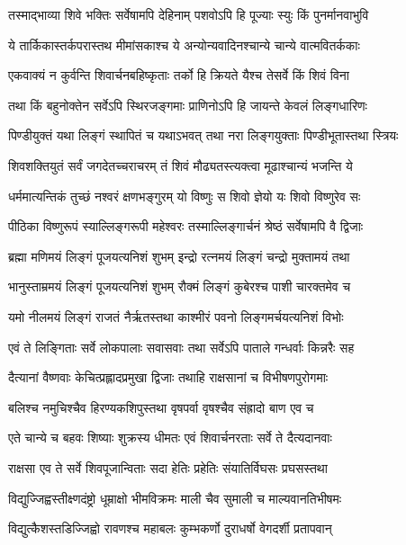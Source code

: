 \twolineshloka
{तस्माद्भाव्या शिवे भक्तिः सर्वेषामपि देहिनाम्}
{पशवोऽपि हि पूज्याः स्युः किं पुनर्मानवाभुवि}%

\twolineshloka
{ये तार्किकास्तर्कपरास्तथ मीमांसकाश्च ये}
{अन्योन्यवादिनश्चान्ये चान्ये वात्मवितर्ककाः}%

\twolineshloka
{एकवाक्यं न कुर्वन्ति शिवार्चनबहिष्कृताः}
{तर्को हि क्रियते यैश्च तेसर्वे किं शिवं विना}%

\twolineshloka
{तथा किं बहुनोक्तेन सर्वेऽपि स्थिरजङ्गमाः}
{प्राणिनोऽपि हि जायन्ते केवलं लिङ्गधारिणः}%

\twolineshloka
{पिण्डीयुक्तं यथा लिङ्गं स्थापितं च यथाऽभवत्}
{तथा नरा लिङ्गयुक्ताः पिण्डीभूतास्तथा स्त्रियः}%

\twolineshloka
{शिवशक्तियुतं सर्वं जगदेतच्चराचरम्}
{तं शिवं मौढ्यतस्त्यक्त्वा मूढाश्चान्यं भजन्ति ये}%

\twolineshloka
{धर्ममात्यन्तिकं तुच्छं नश्वरं क्षणभङ्गुरम्}
{यो विष्णुः स शिवो ज्ञेयो यः शिवो विष्णुरेव सः}%

\twolineshloka
{पीठिका विष्णुरूपं स्याल्लिङ्गरूपी महेश्वरः}
{तस्माल्लिङ्गार्चनं श्रेष्ठं सर्वेषामपि वै द्विजाः}%

\twolineshloka
{ब्रह्मा मणिमयं लिङ्गं पूजयत्यनिशं शुभम्}
{इन्द्रो रत्नमयं लिङ्गं चन्द्रो मुक्तामयं तथा}%

\twolineshloka
{भानुस्ताम्रमयं लिङ्गं पूजयत्यनिशं शुभम्}
{रौक्मं लिङ्गं कुबेरश्च पाशी चारक्तमेव च}%

\twolineshloka
{यमो नीलमयं लिङ्गं राजतं नैर्ऋतस्तथा}
{काश्मीरं पवनो लिङ्गमर्चयत्यनिशं विभोः}%

\twolineshloka
{एवं ते लिङ्गिताः सर्वे लोकपालाः सवासवाः}
{तथा सर्वेऽपि पाताले गन्धर्वाः किन्नरैः सह}%

\twolineshloka
{दैत्यानां वैष्णवाः केचित्प्रह्लादप्रमुखा द्विजाः}
{तथाहि राक्षसानां च विभीषणपुरोगमाः}%

\twolineshloka
{बलिश्च नमुचिश्चैव हिरण्यकशिपुस्तथा}
{वृषपर्वा वृषश्चैव संह्रादो बाण एव च}%

\twolineshloka
{एते चान्ये च बहवः शिष्याः शुक्रस्य धीमतः}
{एवं शिवार्चनरताः सर्वे ते दैत्यदानवाः}%

\twolineshloka
{राक्षसा एव ते सर्वे शिवपूजान्विताः सदा}
{हेतिः प्रहेतिः संयातिर्विघसः प्रघसस्तथा}%

\twolineshloka
{विद्युज्जिह्वस्तीक्ष्णदंष्ट्रो धूम्राक्षो भीमविक्रमः}
{माली चैव सुमाली च माल्यवानतिभीषमः}%

\twolineshloka
{विद्युत्कैशस्तडिज्जिह्वो रावणश्च महाबलः}
{कुम्भकर्णो दुराधर्षो वेगदर्शी प्रतापवान्}%

